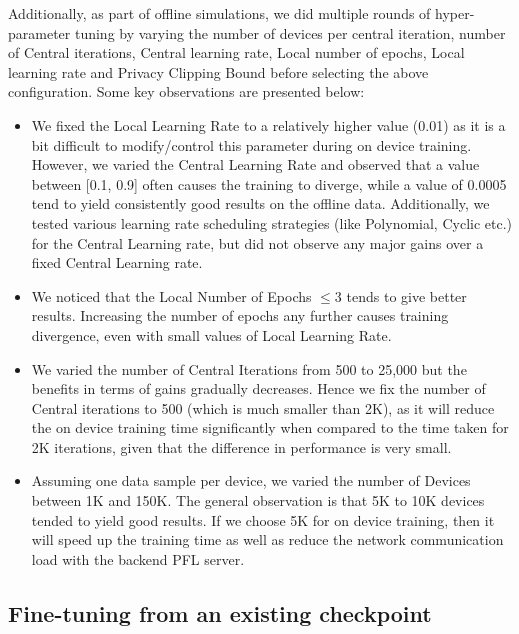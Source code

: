 Additionally, as part of offline simulations, we did multiple rounds of hyper-parameter tuning by varying the number of devices per central iteration, number of Central iterations, Central learning rate, Local number of epochs, Local learning rate and Privacy Clipping Bound before selecting the above configuration.
Some key observations are presented below:
\begin{itemize}
    \item We fixed the Local Learning Rate to a relatively higher value (0.01) as it is a bit difficult to modify/control this parameter during on device training. However, we varied the Central Learning Rate and observed that a value between [0.1, 0.9] often causes the training to diverge, while a value of 0.0005 tend to yield consistently good results on the offline data. Additionally, we tested various learning rate scheduling strategies (like Polynomial, Cyclic etc.) for the Central Learning rate, but did not observe any major gains over a fixed Central Learning rate.
    \item We noticed that the Local Number of Epochs  $\leq3$ tends to give better results. Increasing the number of epochs any further causes training divergence, even with small values of Local Learning Rate.
    \item We varied the number of Central Iterations from 500 to 25,000 but the benefits in terms of gains gradually decreases. Hence we fix the number of Central iterations to 500 (which is much smaller than 2K), as it will reduce the on device training time significantly when compared to the time taken for 2K iterations, given that the difference in performance is very small.
    \item Assuming one data sample per device, we varied the number of Devices between 1K and 150K. The general observation is that 5K to 10K devices tended to yield good results. If we choose 5K for on device training, then it will speed up the training time as well as reduce the network communication load with the backend PFL server.
\end{itemize}




\subsection{Fine-tuning from an existing checkpoint}
\label{sec:finetune_chkp}

